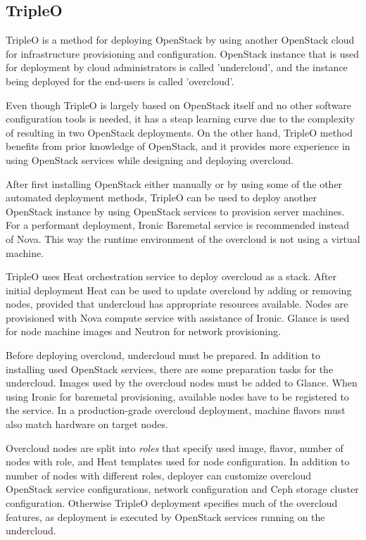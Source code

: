 \documentclass[officiallayout]{tktla}
\begin{document}
\subsection{TripleO}

TripleO \cite{tripleo} is a method for deploying OpenStack by using another
OpenStack cloud for infrastructure provisioning and configuration. OpenStack
instance that is used for deployment by cloud administrators is called
'undercloud', and the instance being deployed for the end-users is called
'overcloud'.

Even though TripleO is largely based on OpenStack itself and no other software
configuration tools is needed, it has a steap learning curve due to the
complexity of resulting in two OpenStack deployments. On the other hand,
TripleO method benefits from prior knowledge of OpenStack, and it provides more
experience in using OpenStack services while designing and deploying overcloud.

After first installing OpenStack either manually or by using some of the other
automated deployment methods, TripleO can be used to deploy another OpenStack
instance by using OpenStack services to provision server machines. For a
performant deployment, Ironic Baremetal service is recommended instead of Nova.
This way the runtime environment of the overcloud is not using a virtual
machine.

TripleO uses Heat orchestration service to deploy overcloud as a stack. After
initial deployment Heat can be used to update overcloud by adding or removing
nodes, provided that undercloud has appropriate resources available. Nodes are
provisioned with Nova compute service with assistance of Ironic. Glance is used
for node machine images and Neutron for network provisioning.

Before deploying overcloud, undercloud must be prepared. In addition to
installing used OpenStack services, there are some preparation tasks for the
undercloud. Images used by the overcloud nodes must be added to Glance. When
using Ironic for baremetal provisioning, available nodes have to be registered
to the service. In a production-grade overcloud deployment, machine flavors
must also match hardware on target nodes.

Overcloud nodes are split into \textit{roles} that specify used image, flavor,
number of nodes with role, and Heat templates used for node configuration. In
addition to number of nodes with different roles, deployer can customize
overcloud OpenStack service configurations, network configuration and Ceph
storage cluster configuration. Otherwise TripleO deployment specifies much of
the overcloud features, as deployment is executed by OpenStack services running
on the undercloud.
\end{document}

